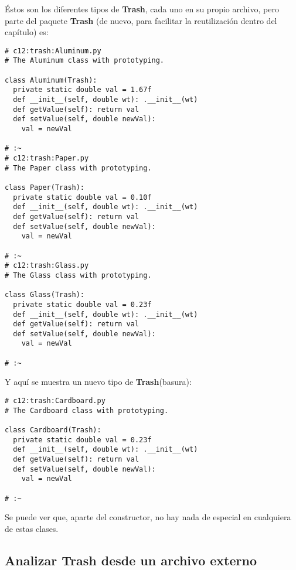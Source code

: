 Éstos son los diferentes tipos de \textbf{Trash}, cada uno en su propio archivo, pero parte del paquete \textbf{Trash} (de nuevo, para facilitar la reutilización dentro del capítulo) es:       \newline

\begin{lstlisting} 
# c12:trash:Aluminum.py  
# The Aluminum class with prototyping. 

class Aluminum(Trash): 
  private static double val = 1.67f 
  def __init__(self, double wt): .__init__(wt)  
  def getValue(self): return val  
  def setValue(self, double newVal): 
    val = newVal 
    
# :~ 
# c12:trash:Paper.py  
# The Paper class with prototyping. 

class Paper(Trash): 
  private static double val = 0.10f 
  def __init__(self, double wt): .__init__(wt)  
  def getValue(self): return val  
  def setValue(self, double newVal): 
    val = newVal 
    
# :~ 
# c12:trash:Glass.py  
# The Glass class with prototyping.

class Glass(Trash): 
  private static double val = 0.23f 
  def __init__(self, double wt): .__init__(wt)  
  def getValue(self): return val  
  def setValue(self, double newVal): 
    val = newVal 
    
# :~ 
\end{lstlisting}

Y aquí se muestra un nuevo tipo de \textbf{Trash}(basura):

\begin{lstlisting} 
# c12:trash:Cardboard.py  
# The Cardboard class with prototyping. 

class Cardboard(Trash): 
  private static double val = 0.23f 
  def __init__(self, double wt): .__init__(wt)  
  def getValue(self): return val  
  def setValue(self, double newVal): 
    val = newVal 
    
# :~ 
\end{lstlisting}

Se puede ver que, aparte del constructor, no hay nada de especial en cualquiera de estas clases.


\subsection*{Analizar \textbf{Trash} desde un archivo externo}
\label{subsec:atduae}


